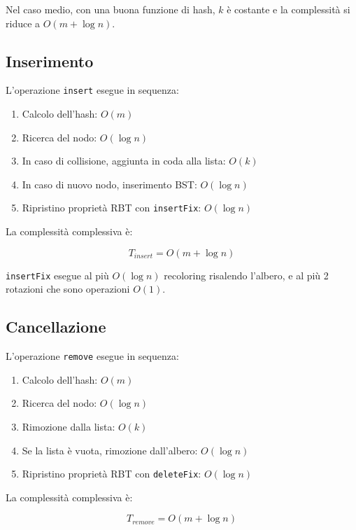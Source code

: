 Nel caso medio, con una buona funzione di hash, $k$ è costante e la 
complessità si riduce a $O(m + \log n)$.

\subsection{Inserimento}

L'operazione \texttt{insert} esegue in sequenza:

\begin{enumerate}
    \item Calcolo dell'hash: $O(m)$
    \item Ricerca del nodo: $O(\log n)$
    \item In caso di collisione, aggiunta in coda alla lista: $O(k)$
    \item In caso di nuovo nodo, inserimento BST: $O(\log n)$
    \item Ripristino proprietà RBT con \texttt{insertFix}: $O(\log n)$
\end{enumerate}

La complessità complessiva è:

\begin{equation}
    T_{insert} = O(m + \log n)
\end{equation}

\texttt{insertFix} esegue al più $O(\log n)$ recoloring risalendo l'albero, 
e al più 2 rotazioni che sono operazioni $O(1)$.

\subsection{Cancellazione}

L'operazione \texttt{remove} esegue in sequenza:

\begin{enumerate}
    \item Calcolo dell'hash: $O(m)$
    \item Ricerca del nodo: $O(\log n)$
    \item Rimozione dalla lista: $O(k)$
    \item Se la lista è vuota, rimozione dall'albero: $O(\log n)$
    \item Ripristino proprietà RBT con \texttt{deleteFix}: $O(\log n)$
\end{enumerate}

La complessità complessiva è:

\begin{equation}
    T_{remove} = O(m + \log n)
\end{equation}

